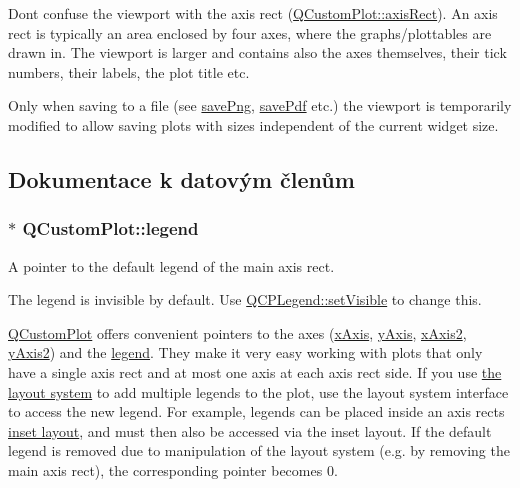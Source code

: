 Don\textquotesingle{}t confuse the viewport with the axis rect (\hyperlink{classQCustomPlot_a4a37a1add5fe63060ac518cf0a4c4050}{Q\+Custom\+Plot\+::axis\+Rect}). An axis rect is typically an area enclosed by four axes, where the graphs/plottables are drawn in. The viewport is larger and contains also the axes themselves, their tick numbers, their labels, the plot title etc.

Only when saving to a file (see \hyperlink{classQCustomPlot_a7636261aff1f6d25c9da749ece3fc8b8}{save\+Png}, \hyperlink{classQCustomPlot_a632da44c6d94ea8b271eb483b08b5114}{save\+Pdf} etc.) the viewport is temporarily modified to allow saving plots with sizes independent of the current widget size. 

\subsection{Dokumentace k datovým členům}
\hypertarget{classQCustomPlot_a4eadcd237dc6a09938b68b16877fa6af}{}
\subsubsection[{legend}]{ $\ast$ Q\+Custom\+Plot\+::legend}\label{classQCustomPlot_a4eadcd237dc6a09938b68b16877fa6af}


A pointer to the default legend of the main axis rect. 

The legend is invisible by default. Use \hyperlink{classQCPLayerable_a3bed99ddc396b48ce3ebfdc0418744f8}{Q\+C\+P\+Legend\+::set\+Visible} to change this.

\hyperlink{classQCustomPlot}{Q\+Custom\+Plot} offers convenient pointers to the axes (\hyperlink{classQCustomPlot_a9a79cd0158a4c7f30cbc702f0fd800e4}{x\+Axis}, \hyperlink{classQCustomPlot_af6fea5679725b152c14facd920b19367}{y\+Axis}, \hyperlink{classQCustomPlot_ada41599f22cad901c030f3dcbdd82fd9}{x\+Axis2}, \hyperlink{classQCustomPlot_af13fdc5bce7d0fabd640f13ba805c0b7}{y\+Axis2}) and the \hyperlink{classQCustomPlot_a4eadcd237dc6a09938b68b16877fa6af}{legend}. They make it very easy working with plots that only have a single axis rect and at most one axis at each axis rect side. If you use \hyperlink{}{the layout system} to add multiple legends to the plot, use the layout system interface to access the new legend. For example, legends can be placed inside an axis rect\textquotesingle{}s \hyperlink{classQCPAxisRect_a4114887c7141b59650b7488f930993e5}{inset layout}, and must then also be accessed via the inset layout. If the default legend is removed due to manipulation of the layout system (e.\+g. by removing the main axis rect), the corresponding pointer becomes 0. \hypertarget{classQCustomPlot_a9a79cd0158a4c7f30cbc702f0fd800e4}{}
